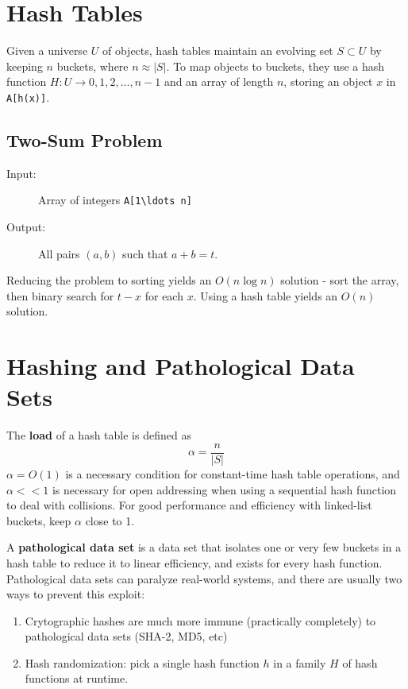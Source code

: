 \documentclass[11pt]{article}
\begin{document}
\section{Hash Tables}
	Given a universe $U$ of objects, hash tables maintain an evolving set $S\subset U$ by keeping $n$ buckets, where $n\approx |S|$. To map objects to buckets, they use a hash function $H: U \rightarrow {0, 1, 2, \ldots , n-1}$ and an array of length $n$, storing an object $x$ in \verb|A[h(x)]|.
	
	\subsection{Two-Sum Problem}
		\begin{description}
			\item[Input:] Array of integers \verb|A[1\ldots n]|
			\item[Output:] All pairs $(a, b)$ such that $a + b = t$.
		\end{description}
		
		Reducing the problem to sorting yields an $O(n\log n)$ solution - sort the array, then binary search for $t-x$ for each $x$. Using a hash table yields an $O(n)$ solution.
		
\section{Hashing and Pathological Data Sets}
	The \textbf{load} of a hash table is defined as 
	\begin{equation}
		\alpha = \frac{n}{|S|}
	\end{equation}
	$\alpha = O(1)$ is a necessary condition for constant-time hash table operations, and $\alpha << 1$ is necessary for open addressing when using a sequential hash function to deal with collisions. For good performance and efficiency with linked-list buckets, keep $\alpha$ close to 1. 
	
	A \textbf{pathological data set} is a data set that isolates one or very few buckets in a hash table to reduce it to linear efficiency, and exists for every hash function. Pathological data sets can paralyze real-world systems, and there are usually two ways to prevent this exploit:
	\begin{enumerate}
		\item Crytographic hashes are much more immune (practically completely) to pathological data sets (SHA-2, MD5, etc)
		\item Hash randomization: pick a single hash function $h$ in a family $H$ of hash functions at runtime.
	\end{enumerate}
%		
%		


\end{document}
